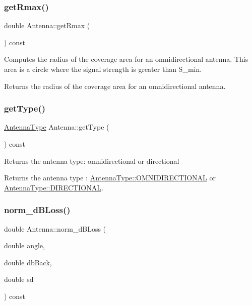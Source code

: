 \mbox{\label{class_antenna_adf33d1b0be85f95c543a31dc1b3159f5}} 
\subsubsection{\texorpdfstring{get\+Rmax()}{getRmax()}}
{\footnotesize\ttfamily double Antenna\+::get\+Rmax (\begin{DoxyParamCaption}{ }\end{DoxyParamCaption}) const}

Computes the radius of the coverage area for an omnidirectional antenna. This area is a circle where the signal strength is greater than S\+\_\+min. \begin{DoxyReturn}{Returns}
the radius of the coverage area for an omnidirectional antenna. 
\end{DoxyReturn}
\mbox{\label{class_antenna_adf45a8b339956741bf8dcb5361f5f249}} 
\subsubsection{\texorpdfstring{get\+Type()}{getType()}}
{\footnotesize\ttfamily \hyperlink{_antenna_type_8h_a7b678b5cb9dedc607131200119d96b16}{Antenna\+Type} Antenna\+::get\+Type (\begin{DoxyParamCaption}{ }\end{DoxyParamCaption}) const}

Returns the antenna type\+: omnidirectional or directional \begin{DoxyReturn}{Returns}
the antenna type \+: \hyperlink{_antenna_type_8h_a7b678b5cb9dedc607131200119d96b16a8ff57fa72952e98025e600a041b8b8de}{Antenna\+Type\+::\+O\+M\+N\+I\+D\+I\+R\+E\+C\+T\+I\+O\+N\+AL} or \hyperlink{_antenna_type_8h_a7b678b5cb9dedc607131200119d96b16ab6f2249394a4def60a78b342dcc925b9}{Antenna\+Type\+::\+D\+I\+R\+E\+C\+T\+I\+O\+N\+AL}. 
\end{DoxyReturn}
\mbox{\label{class_antenna_a8270b1a03b61af1e048650e00a129b93}} 
\subsubsection{\texorpdfstring{norm\+\_\+d\+B\+Loss()}{norm\_dBLoss()}}
{\footnotesize\ttfamily double Antenna\+::norm\+\_\+d\+B\+Loss (\begin{DoxyParamCaption}\item[{double}]{angle,  }\item[{double}]{db\+Back,  }\item[{double}]{sd }\end{DoxyParamCaption}) const\hspace{0.3cm}{\ttfamily [private]}}

